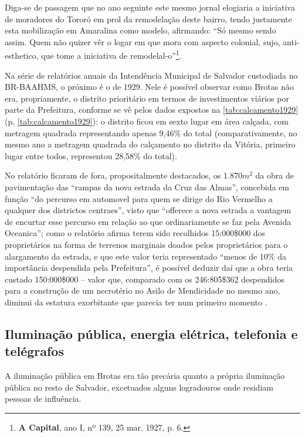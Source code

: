 Diga-se de passagem que no ano seguinte este mesmo jornal elogiaria a iniciativa de moradores do Tororó em prol da remodelação deste bairro, tendo justamente esta mobilização em Amaralina como modelo, afirmando: ``Só mesmo sendo assim. Quem não quizer vêr o logar em que mora com aspecto colonial, sujo, anti-esthetico, que tome a iniciativa de remodelal-o''\footnote{\textbf{A Capital}, ano I, nº 139, 25 mar. 1927, p. 6.}.

Na série de relatórios anuais da Intendência Municipal de Salvador custodiada no BR-BAAHMS, o próximo é o de 1929. Nele é possível observar como Brotas não era, propriamente, o distrito prioritário em termos de investimentos viários por parte da Prefeitura, conforme se vê pelos dados expostos na \autoref{tab:calcamento1929} (p. \autoref{tab:calcamento1929}): o distrito ficou em sexto lugar em área calçada, com metragem quadrada representando apenas 9,46\% do total (comparativamente, no mesmo ano a metragem quadrada do calçamento no distrito da Vitória, primeiro lugar entre todos, representou 28,58\% do total).



No relatório ficaram de fora, propositalmente destacados, os 1.870$m^{2}$ da obra de pavimentação das “rampas da nova estrada da Cruz das Almas”, concebida em função “do percurso em automovel para quem se dirige do Rio Vermelho a qualquer dos districtos centraes”, visto que “offerece a nova estrada a vantagem de encurtar esse percurso em relação ao que ordinariamente se faz pela Avenida Oceanica”; como o relatório afirma terem sido recolhidos 15:000\$000 dos proprietários na forma de terrenos marginais doados pelos proprietários para o alargamento da estrada, e que este valor teria representado “menos de 10\% da importância despendida pela Prefeitura”, é possível deduzir daí que a obra teria custado 150:000\$000 – valor que, comparado com os 246:805\$362 despendidos para a construção de um necrotério no Asilo de Mendicidade no mesmo ano, diminui da estatura exorbitante que parecia ter num primeiro momento \cite[pp.~22-23]{salvador_relatorio_1929}.

\subsection{Iluminação pública, energia elétrica, telefonia e telégrafos}

A iluminação pública em Brotas era tão precária quanto a própria iluminação pública no resto de Salvador, excetuados alguns logradouros onde residiam pessoas de influência.

